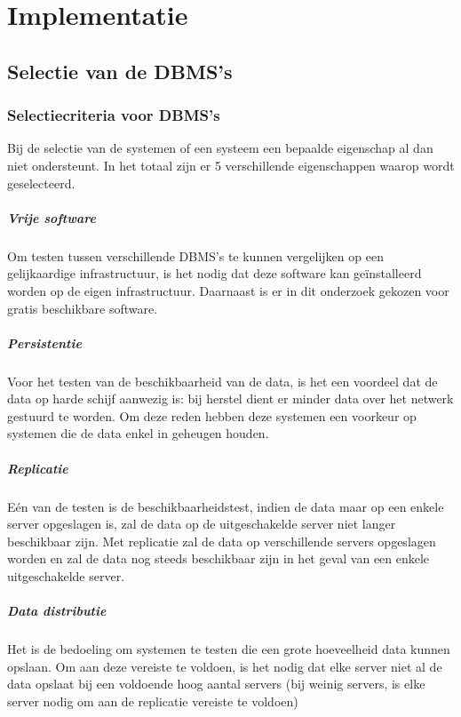 \chapter{Implementatie}

\section{Selectie van de DBMS's}

\subsection{Selectiecriteria voor DBMS's}
Bij de selectie van de systemen of een systeem een bepaalde eigenschap al dan niet ondersteunt. In het totaal zijn er 5 verschillende eigenschappen waarop wordt geselecteerd. 

\paragraph{Vrije software} Om testen tussen verschillende DBMS's te kunnen vergelijken op een gelijkaardige infrastructuur, is het nodig dat deze software kan geïnstalleerd worden op de eigen infrastructuur. Daarnaast is er in dit onderzoek gekozen voor gratis beschikbare software. 

\paragraph{Persistentie} Voor het testen van de beschikbaarheid van de data, is het een voordeel dat de data op harde schijf aanwezig is: bij herstel dient er minder data over het netwerk gestuurd te worden. Om deze reden hebben deze systemen een voorkeur op systemen die de data enkel in geheugen houden. 

\paragraph{Replicatie} Eén van de testen is de beschikbaarheidstest, indien de data maar op een enkele server opgeslagen is, zal de data op de uitgeschakelde server niet langer beschikbaar zijn. Met replicatie zal de data op verschillende servers opgeslagen worden en zal de data nog steeds beschikbaar zijn in het geval van een enkele uitgeschakelde server. 

\paragraph{Data distributie} Het is de bedoeling om systemen te testen die een grote hoeveelheid data kunnen opslaan. Om aan deze vereiste te voldoen, is het nodig dat elke server niet al de data opslaat bij een voldoende hoog aantal servers (bij weinig servers, is elke server nodig om aan de replicatie vereiste te voldoen)

